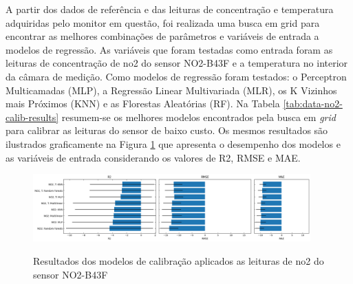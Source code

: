 A partir dos dados de referência e das leituras de concentração e temperatura adquiridas pelo monitor em questão, foi realizada uma busca em grid para encontrar as melhores combinações de parâmetros e variáveis de entrada a modelos de regressão. As variáveis que foram testadas como entrada foram as leituras de concentração de \acrshort{no2} do sensor NO2-B43F e a temperatura no interior da câmara de medição. Como modelos de regressão foram testados: o Perceptron Multicamadas (MLP), a Regressão Linear Multivariada (MLR), os K Vizinhos mais Próximos (KNN) e as Florestas Aleatórias (RF). Na Tabela \ref{tab:data-no2-calib-results} resumem-se os melhores modelos encontrados pela busca em \textit{grid} para calibrar as leituras do sensor de baixo custo. Os mesmos resultados são ilustrados graficamente na Figura \ref{fig:data-no2-models-performance} que apresenta o desempenho dos modelos e as variáveis de entrada considerando os valores de R2, RMSE e MAE.

\begin{figure}[h!]
    \centering
    \caption{Resultados dos modelos de calibração aplicados as leituras de \acrshort{no2} do sensor NO2-B43F}
    \includegraphics[width=0.95\textwidth]{chapters/4-CALIBRAÇÃO MÚLTIPLOS SENSORES/Figuras/no2-B43F-models-performance.png}
    \label{fig:data-no2-models-performance}
\end{figure}

